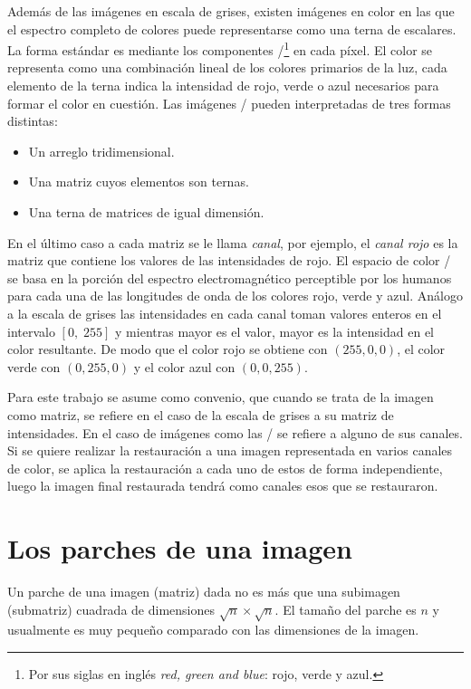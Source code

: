 Además de las imágenes en escala de grises, existen imágenes en color en las que el espectro completo de colores puede representarse como una terna de escalares. La forma est\'andar es mediante los componentes \RGB/\footnote{Por sus siglas en ingl\'es \textit{red, green and blue}: rojo, verde y azul.}\cite{enwiki:rgb} en cada píxel. El color se representa como una combinación lineal de los colores primarios de la luz, cada elemento de la terna indica la intensidad de rojo, verde o azul necesarios para formar el color en cuesti\'on. Las im\'agenes \RGB/ pueden interpretadas de tres formas distintas:
\begin{itemize}
	\item Un arreglo tridimensional.
	\item Una matriz cuyos elementos son ternas.
	\item Una terna de matrices de igual dimensi\'on.
\end{itemize}
En el \'ultimo caso a cada matriz se le llama \textit{canal}, por ejemplo, el \textit{canal rojo} es la matriz que contiene los valores de las intensidades de rojo. El espacio de color \RGB/ se basa en la porción del espectro electromagnético perceptible por los humanos para cada una de las longitudes de onda de los colores rojo, verde y azul. An\'alogo a la escala de grises las intensidades en cada canal toman valores enteros en el intervalo $[0,\; 255]$ y mientras mayor es el valor, mayor es la intensidad en el color resultante. De modo que el color rojo se obtiene con $(255,0,0)$, el color verde con $(0,255,0)$ y el color azul con $(0,0,255)$.

Para este trabajo se asume como convenio, que cuando se trata de la imagen como matriz, se refiere en el caso de la escala de grises a su matriz de intensidades. En el caso de im\'agenes como las \RGB/ se refiere a alguno de sus canales. Si se quiere realizar la restauraci\'on a una imagen representada en varios canales de color, se aplica la restauraci\'on a cada uno de estos de forma independiente, luego la imagen final restaurada tendr\'a como canales esos que se restauraron.


\section{Los parches de una imagen}\label{sec:patches}

\begin{definition}
	Un parche  de una imagen (matriz) dada no es m\'as que una subimagen (submatriz) cuadrada de dimensiones $\sqrt{n} \times \sqrt{n}$. El tamaño del parche es $n$ y usualmente es muy peque\~no comparado con las dimensiones de la imagen.
\end{definition}

